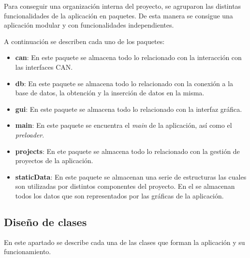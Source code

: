 Para conseguir una organización interna del proyecto, se agruparon las distintas funcionalidades de la aplicación en paquetes. De esta manera se consigue una aplicación modular y con funcionalidades independientes.


A continuación se describen cada uno de los paquetes:

\begin{itemize}
\item
\textbf{can}: En este paquete se almacena todo lo relacionado con la interacción con las interfaces CAN.
\item
\textbf{db}: En este paquete se almacena todo lo relacionado con la conexión a la base de datos, la obtención y la inserción de datos en la misma.
\item
\textbf{gui}: En este paquete se almacena todo lo relacionado con la interfaz gráfica. 
\item
\textbf{main}: En este paquete se encuentra el \emph{main} de la aplicación, así como el \emph{preloader}.
\item
\textbf{projects}: En ete paquete se almacena todo lo relacionado con la gestión de proyectos de la aplicación.
\item
\textbf{staticData}: En este paquete se almacenan una serie de estructuras las cuales son utilizadas por distintos componentes del proyecto. En el se almacenan todos los datos que son representados por las gráficas de la aplicación.
\end{itemize}


\subsection{Diseño de clases}

En este apartado se describe cada una de las clases que forman la aplicación y su funcionamiento.




